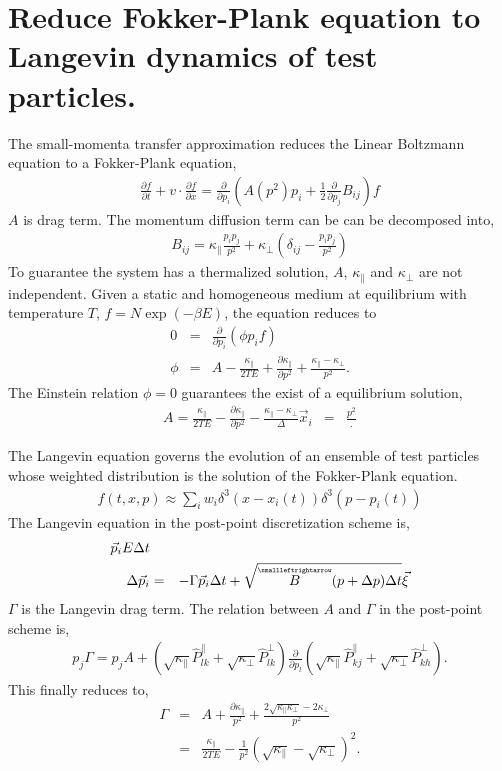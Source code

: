 \documentclass[10pt,a4paper]{article}
\newcommand{\ppi}{\frac{\partial}{\partial p_i}}
\newcommand{\ppj}{\frac{\partial}{\partial p_j}}
\newcommand{\ppl}{\frac{\partial}{\partial p_l}}
\newcommand{\Kpara}{\kappa_{\|}}
\newcommand{\Kperp}{\kappa_{\perp}}
\newcommand{\Ppara}{\hat{P}^{\|}}
\newcommand{\Pperp}{\hat{P}^{\perp}}
\newcommand{\tensor}[1]{\overset{\scriptscriptstyle\smallleftrightarrow}{#1}}
\begin{document}
\section{Reduce Fokker-Plank equation to Langevin dynamics of test particles.}
The small-momenta transfer approximation reduces the Linear Boltzmann equation to a Fokker-Plank equation,
\begin{eqnarray}
\frac{\partial f}{\partial t} + v\cdot\frac{\partial f}{\partial x}
= \ppi \left(A(p^2) p_i + \frac{1}{2}\ppj B_{ij}\right)f 
\end{eqnarray}
$A$ is drag term. The momentum diffusion term can be can be decomposed into,
\begin{eqnarray}
B_{ij} = \Kpara \frac{p_i p_j}{p^2} + \Kperp \left(\delta_{ij} - \frac{p_i p_j}{p^2}\right)
\end{eqnarray}
To guarantee the system has a thermalized solution, $A$, $\Kpara$ and $\Kperp$ are not independent.
Given a static and homogeneous medium at equilibrium with temperature $T$, $f = N\exp\left(-\beta E\right)$, the equation reduces to
\begin{eqnarray}
0 &=& \ppi(\phi p_i f)\\
\phi &=& A - \frac{\Kpara}{2TE} + \frac{\partial \Kpara}{\partial p^2} + \frac{\Kpara-\Kperp}{p^2}.
\end{eqnarray}
The Einstein relation $\phi = 0$ guarantees the exist of a equilibrium solution,
\begin{eqnarray}
A = \frac{\Kpara}{2TE} - \frac{\partial \Kpara}{\partial p^2} - \frac{\Kpara-\Kperp}
\Delta \vec{x}_i &=& \frac{p^2}.
\end{eqnarray}

The Langevin equation governs the evolution of an ensemble of test particles whose weighted distribution is the solution of the Fokker-Plank equation.
\begin{eqnarray}
f(t,x,p) \approx \sum_{i} w_i \delta^3(x-x_i(t)) \delta^3(p-p_i(t))
\end{eqnarray}
The Langevin equation in the post-point discretization scheme is,
\begin{eqnarray}{\vec{p}_i}{E} \Delta t	\\
\Delta \vec{p}_i &=& -\Gamma \vec{p}_i \Delta t + \sqrt{\tensor{B}(p+\Delta p) \Delta t  }\vec{\xi}
\end{eqnarray}
$\Gamma$ is the Langevin drag term.
The relation between $A$ and $\Gamma$ in the post-point scheme is,
\begin{eqnarray}
p_j \Gamma  = p_jA + \left(\sqrt{\Kpara}\Ppara_{lk} + \sqrt{\Kperp}\Pperp_{lk}\right) \ppl \left( \sqrt{\Kpara}\Ppara_{kj} + \sqrt{\Kperp}\Pperp_{kh} \right).
\end{eqnarray}
This finally reduces to,
\begin{eqnarray}
\Gamma &=& A + \frac{\partial \Kpara}{p^2} + \frac{2\sqrt{\Kpara\Kperp} - 2\Kperp}{p^2} \\
 &=& \frac{\Kpara}{2TE} - \frac{1}{p^2}\left( \sqrt{\Kpara} - \sqrt{\Kperp} \right)^2.
\end{eqnarray}
\end{document}
